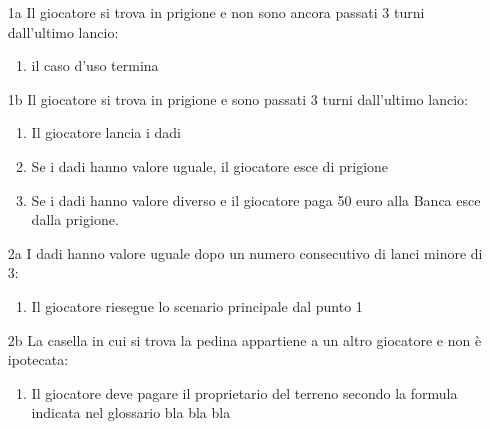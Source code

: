 \documentclass{article}
\begin{document}
\begin{enumerate}
    \item [1a] Il giocatore si trova in prigione e non sono ancora passati 3 turni dall'ultimo lancio:
    \begin{enumerate}
        \item il caso d'uso termina
    \end{enumerate}
    \item [1b] Il giocatore si trova in prigione e sono passati 3 turni dall'ultimo lancio:
        \begin{enumerate}
            \item Il giocatore lancia i dadi
            \item Se i dadi hanno valore uguale, il giocatore esce di prigione
            \item Se i dadi hanno valore diverso e il giocatore paga 50 euro alla Banca esce dalla prigione.
        \end{enumerate}
    \item [2a] I dadi hanno valore uguale dopo un numero consecutivo di lanci minore di 3:
    \begin{enumerate}
        \item Il giocatore riesegue lo scenario principale dal punto 1
    \end{enumerate}
    \item [2b] La casella in cui si trova la pedina appartiene a un altro giocatore e non è ipotecata:
    \begin{enumerate}
        \item Il giocatore deve pagare il proprietario del terreno secondo la formula indicata nel glossario bla bla bla
    \end{enumerate}
    

\end{enumerate}
\end{document}
